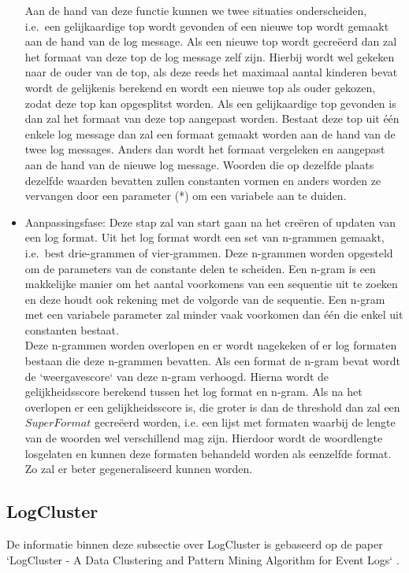 \begin{itemize}
    Aan de hand van deze functie kunnen we twee situaties onderscheiden, i.e.\ een gelijkaardige top wordt gevonden of een nieuwe top wordt gemaakt aan de hand van de log message. Als een nieuwe top wordt gecreëerd dan zal het formaat van deze top de log message zelf zijn. Hierbij wordt wel gekeken naar de ouder van de top, als deze reeds het maximaal aantal kinderen bevat wordt de gelijkenis berekend en wordt een nieuwe top als ouder gekozen, zodat deze top kan opgesplitst worden. Als een gelijkaardige top gevonden is dan zal het formaat van deze top aangepast worden. Bestaat deze top uit één enkele log message dan zal een formaat gemaakt worden aan de hand van de twee log messages. Anders dan wordt het formaat vergeleken en aangepast aan de hand van de nieuwe log message. Woorden die op dezelfde plaats dezelfde waarden bevatten zullen constanten vormen en anders worden ze vervangen door een parameter (*) om een variabele aan te duiden.\\
    
    \item Aanpassingsfase: Deze stap zal van start gaan na het creëren of updaten van een log format. Uit het log format wordt een set van n-grammen gemaakt, i.e.\ best drie-grammen of vier-grammen. Deze n-grammen worden opgesteld om de parameters van de constante delen te scheiden. Een n-gram is een makkelijke manier om het aantal voorkomens van een sequentie uit te zoeken en deze houdt ook rekening met de volgorde van de sequentie. Een n-gram met een variabele parameter zal minder vaak voorkomen dan één die enkel uit constanten bestaat.\\
    
    Deze n-grammen worden overlopen en er wordt nagekeken of er log formaten bestaan die deze n-grammen bevatten. Als een format de n-gram bevat wordt de `weergavescore` van deze n-gram verhoogd. Hierna wordt de gelijkheidsscore berekend tussen het log format en n-gram. Als na het overlopen er een gelijkheidsscore is, die groter is dan de threshold dan zal een $SuperFormat$ gecreëerd worden, i.e. een lijst met formaten waarbij de lengte van de woorden wel verschillend mag zijn. Hierdoor wordt de woordlengte losgelaten en kunnen deze formaten behandeld worden als eenzelfde format. Zo zal er beter gegeneraliseerd kunnen worden.
\end{itemize}

\subsection{LogCluster}
De informatie binnen deze subsectie over LogCluster is gebaseerd op de paper `LogCluster - A Data Clustering and Pattern Mining Algorithm for Event Logs` \autocite{vaarandi2015logcluster}.


